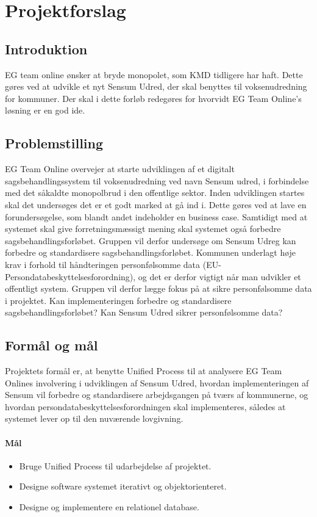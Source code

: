 \documentclass[../../main.tex]{subfiles}
\begin{document}
\section{Projektforslag}
\subsection{Introduktion}
EG team online ønsker at bryde monopolet, som KMD tidligere har haft.
Dette gøres ved at udvikle et nyt Sensum Udred, der skal benyttes til voksenudredning for kommuner.
Der skal i dette forløb redegøres for hvorvidt EG Team Online’s løsning er en god ide.

\subsection{Problemstilling}
EG Team Online overvejer at starte udviklingen af et digitalt sagsbehandlingssystem
til voksenudredning ved navn Sensum udred, i forbindelse med det såkaldte
monopolbrud i den offentlige sektor. Inden udviklingen startes skal det undersøges
det er et godt marked at gå ind i. Dette gøres ved at lave en forundersøgelse, som
blandt andet indeholder en business case. Samtidigt med at systemet skal give
forretningsmæssigt mening skal systemet også forbedre sagsbehandlingsforløbet.
Gruppen vil derfor undersøge om Sensum Udreg kan forbedre og standardisere
sagsbehandlingsforløbet.
Kommunen underlagt høje krav i forhold til håndteringen personfølsomme
data (EU-Persondatabeskyttelsesforordning), og det er derfor vigtigt når man
udvikler et offentligt system. Gruppen vil derfor lægge fokus på at sikre
personfølsomme data i projektet. Kan implementeringen forbedre og standardisere
sagsbehandlingsforløbet? Kan Sensum Udred sikrer personfølsomme data?

\subsection{Formål og mål}
Projektets formål er, at benytte Unified Process til at analysere EG Team Onlines
involvering i udviklingen af Sensum Udred, hvordan implementeringen af
Sensum vil forbedre og standardisere arbejdsgangen på tværs af kommunerne, og
hvordan persondatabeskyttelsesforordningen skal implementeres, således at systemet
lever op til den nuværende lovgivning.

\paragraph{Mål}
\begin{itemize}
  \item Bruge Unified Process til udarbejdelse af projektet.
  \item Designe software systemet iterativt og objektorienteret.
  \item Designe og implementere en relationel database.
\end{itemize}
\end{document}
